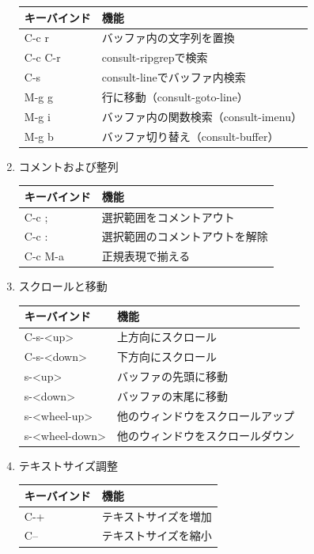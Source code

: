 \documentclass[11pt]{article}
\begin{document}
\begin{enumerate}
\begin{center}
\begin{tabular}{ll}
キーバインド & 機能\\
\hline
C-c r & バッファ内の文字列を置換\\
C-c C-r & consult-ripgrepで検索\\
C-s & consult-lineでバッファ内検索\\
M-g g & 行に移動（consult-goto-line）\\
M-g i & バッファ内の関数検索（consult-imenu）\\
M-g b & バッファ切り替え（consult-buffer）\\
\end{tabular}
\end{center}
\item コメントおよび整列
\label{sec:org8e649c8}
\begin{center}
\begin{tabular}{ll}
キーバインド & 機能\\
\hline
C-c ; & 選択範囲をコメントアウト\\
C-c : & 選択範囲のコメントアウトを解除\\
C-c M-a & 正規表現で揃える\\
\end{tabular}
\end{center}
\item スクロールと移動
\label{sec:org88f515b}
\begin{center}
\begin{tabular}{ll}
キーバインド & 機能\\
\hline
C-s-<up> & 上方向にスクロール\\
C-s-<down> & 下方向にスクロール\\
s-<up> & バッファの先頭に移動\\
s-<down> & バッファの末尾に移動\\
s-<wheel-up> & 他のウィンドウをスクロールアップ\\
s-<wheel-down> & 他のウィンドウをスクロールダウン\\
\end{tabular}
\end{center}
\item テキストサイズ調整
\label{sec:org44042df}
\begin{center}
\begin{tabular}{ll}
キーバインド & 機能\\
\hline
C-+ & テキストサイズを増加\\
C-- & テキストサイズを縮小\\
\end{tabular}
\end{center}

\end{enumerate}
\end{document}
